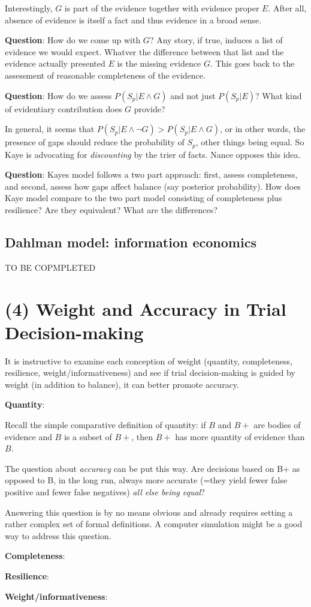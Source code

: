 \documentclass[
  10pt,
  dvipsnames,enabledeprecatedfontcommands]{scrartcl}
\begin{document}
Interestingly, \(G\) is part of the evidence together with evidence
proper \(E\). After all, absence of evidence is itself a fact and thus
evidence in a broad sense.

\textbf{Question}: How do we come up with \(G\)? Any story, if true,
induces a list of evidence we would expect. Whatver the difference
between that list and the evidence actually presented \(E\) is the
missing evidence \(G\). This goes back to the assessment of reasonable
completeness of the evidence.

\textbf{Question}: How do we assess \(P(S_p | E \wedge G)\) and not just
\(P(S_p | E)\)? What kind of evidentiary contribution does \(G\)
provide?

In general, it seems that
\(P(S_p | E \wedge \neg G) > P(S_p | E \wedge G)\), or in other words,
the presence of gaps should reduce the probability of \(S_p\), other
things being equal. So Kaye is advocating for \emph{discounting} by the
trier of facts. Nance opposes this idea.

\textbf{Question}: Kayes model follows a two part approach: first,
assess completeness, and second, assess how gaps affect balance (say
posterior probability). How does Kaye model compare to the two part
model consisting of completeness plus resilience? Are they equivalent?
What are the differences?

\hypertarget{dahlman-model-information-economics}{%
\subsection{Dahlman model: information
economics}\label{dahlman-model-information-economics}}

TO BE COPMPLETED

\hypertarget{weight-and-accuracy-in-trial-decision-making}{%
\section{(4) Weight and Accuracy in Trial
Decision-making}\label{weight-and-accuracy-in-trial-decision-making}}

It is instructive to examine each conception of weight (quantity,
completeness, resilience, weight/informativeness) and see if trial
decision-making is guided by weight (in addition to balance), it can
better promote accuracy.

\textbf{Quantity}:

Recall the simple comparative definition of quantity: if \(B\) and
\(B+\) are bodies of evidence and \(B\) is a subset of \(B+\), then
\(B+\) has more quantity of evidence than \(B\).

The question about \emph{accuracy} can be put this way. Are decisions
based on B+ as opposed to B, in the long run, always more accurate
(=they yield fewer false positive and fewer false negatives)
\textit{all else being equal}?

Answering this question is by no means obvious and already requires
setting a rather complex set of formal definitions. A computer
simulation might be a good way to address this question.

\textbf{Completeness}:

\textbf{Resilience}:

\textbf{Weight/informativeness}:
\end{document}

